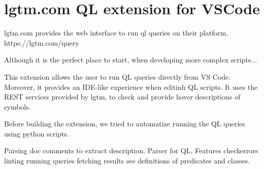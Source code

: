 \chapter{lgtm.com QL extension for VSCode}

lgtm.com provides the web interface to run ql queries on their platform.
https://lgtm.com/query

Although it is the perfect place to start, when developing more complex scripts...

This extension allows the user to run QL queries directly from VS Code.
Moreover, it provides an IDE-like experience when editinh QL scripts.
It uses the REST services provided by lgtm, to check and provide hover descriptions of symbols.

Before building the extension, we tried to automatize running the QL queries using python
scripts.

Parsing doc comments to extract description.
Parser for QL.
Features
checkerrors linting
running queries
fetching results
see definitions of predicates and classes.